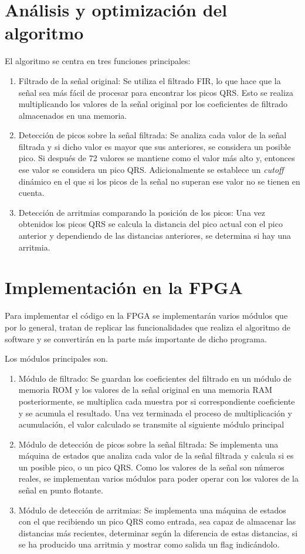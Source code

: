 \section{Análisis y optimización del algoritmo}
El algoritmo se centra en tres funciones principales:
\begin{enumerate}
	\item Filtrado de la señal original: Se utiliza el filtrado FIR, lo que hace que la señal sea más fácil de procesar para encontrar los picos QRS. Esto se realiza multiplicando los valores de la señal original por los coeficientes de filtrado almacenados en una memoria.
	\item Detección de picos sobre la señal filtrada: Se analiza cada valor de la señal filtrada y si dicho valor es mayor que sus anteriores, se considera un posible pico. Si después de 72 valores se mantiene como el valor más alto y, entonces ese valor se considera un pico QRS. Adicionalmente se establece un \textit{cutoff} dinámico en el que si los picos de la señal no superan ese valor no se tienen en cuenta.
	\item Detección de arritmias comparando la posición de los picos: Una vez obtenidos los picos QRS se calcula la distancia del pico actual con el pico anterior y dependiendo de las distancias anteriores, se determina si hay una arritmia.
\end{enumerate}


\section{Implementación en la FPGA}
Para implementar el código en la FPGA se implementarán varios módulos que por lo general, tratan de replicar las funcionalidades que realiza el algoritmo de software y se convertirán en la parte más importante de dicho programa.  

Los módulos principales son.

	\begin{enumerate}
		\item Módulo de filtrado: Se guardan los coeficientes del filtrado en un módulo de memoria ROM y los valores de la señal original en una memoria RAM posteriormente, se multiplica cada muestra por si correspondiente coeficiente y se acumula el resultado. Una vez terminada el proceso de multiplicación y acumulación, el valor calculado se transmite al siguiente módulo principal
		\item Módulo de detección de picos sobre la señal filtrada: Se implementa una máquina de estados que analiza cada valor de la señal filtrada y calcula si es un posible pico, o un pico QRS. Como los valores de la señal son números reales, se implementan varios módulos para poder operar con los valores de la señal en punto flotante. 
		\item Módulo de detección de arritmias: Se implementa una máquina de estados con el que recibiendo un pico QRS como entrada, sea capaz de almacenar las distancias más recientes, determinar según la diferencia de estas distancias, si se ha producido una arritmia y mostrar como salida un flag indicándolo.
	\end{enumerate}
	
